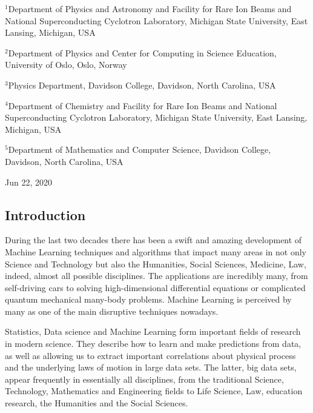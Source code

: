 \documentclass[%
oneside,                 %
final,                   %
10pt]{article}
\begin{document}
\begin{center}
\centerline{{\small ${}^1$Department of Physics and Astronomy and Facility for Rare Ion Beams and National Superconducting Cyclotron Laboratory, Michigan State University, East Lansing, Michigan, USA}}
\centerline{{\small ${}^2$Department of Physics and Center for Computing in Science Education, University of Oslo, Oslo, Norway}}
\centerline{{\small ${}^3$Physics Department, Davidson College, Davidson, North Carolina, USA}}
\centerline{{\small ${}^4$Department of Chemistry and Facility for Rare Ion Beams  and National Superconducting Cyclotron Laboratory, Michigan State University, East Lansing, Michigan, USA}}
\centerline{{\small ${}^5$Department of Mathematics and Computer Science, Davidson College, Davidson, North Carolina, USA}}
\end{center}
    

\begin{center}
Jun 22, 2020
\end{center}

\vspace{1cm}


\subsection*{Introduction}

During the last two decades there has been a swift and amazing
development of Machine Learning techniques and algorithms that impact
many areas in not only Science and Technology but also the Humanities,
Social Sciences, Medicine, Law, indeed, almost all possible
disciplines. The applications are incredibly many, from self-driving
cars to solving high-dimensional differential equations or complicated
quantum mechanical many-body problems. Machine Learning is perceived
by many as one of the main disruptive techniques nowadays. 

Statistics, Data science and Machine Learning form important
fields of research in modern science.  They describe how to learn and
make predictions from data, as well as allowing us to extract
important correlations about physical process and the underlying laws
of motion in large data sets. The latter, big data sets, appear
frequently in essentially all disciplines, from the traditional
Science, Technology, Mathematics and Engineering fields to Life
Science, Law, education research, the Humanities and the Social
Sciences.
\end{document}
